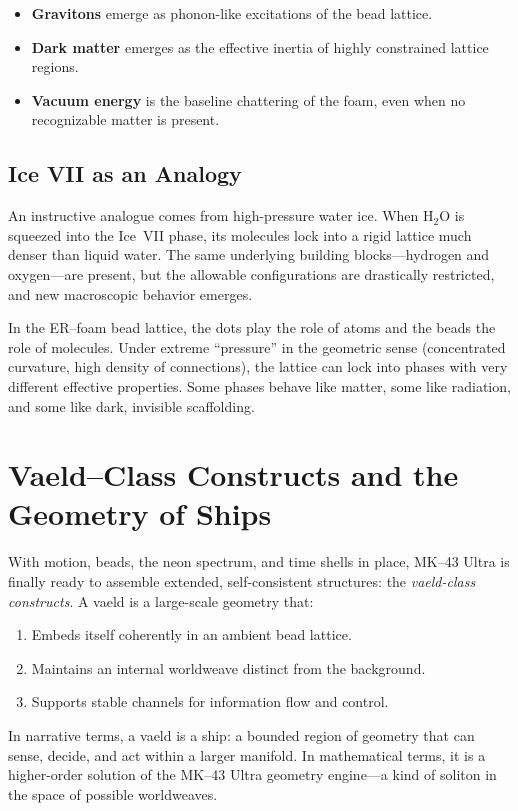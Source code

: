 \begin{itemize}
  \item \textbf{Gravitons} emerge as phonon-like excitations of the bead
  lattice.
  \item \textbf{Dark matter} emerges as the effective inertia of highly
  constrained lattice regions.
  \item \textbf{Vacuum energy} is the baseline chattering of the foam, even
  when no recognizable matter is present.
\end{itemize}

\section{Ice VII as an Analogy}
An instructive analogue comes from high-pressure water ice. When H$_2$O is
squeezed into the Ice~VII phase, its molecules lock into a rigid lattice much
denser than liquid water. The same underlying building blocks---hydrogen and
oxygen---are present, but the allowable configurations are drastically
restricted, and new macroscopic behavior emerges.

In the ER--foam bead lattice, the dots play the role of atoms and the beads
the role of molecules. Under extreme ``pressure'' in the geometric sense
(concentrated curvature, high density of connections), the lattice can lock
into phases with very different effective properties. Some phases behave like
matter, some like radiation, and some like dark, invisible scaffolding.

\chapter{Vaeld--Class Constructs and the Geometry of Ships}
With motion, beads, the neon spectrum, and time shells in place, MK--43 Ultra
is finally ready to assemble extended, self-consistent structures: the
\emph{vaeld-class constructs}. A vaeld is a large-scale geometry that:

\begin{enumerate}
  \item Embeds itself coherently in an ambient bead lattice.
  \item Maintains an internal worldweave distinct from the background.
  \item Supports stable channels for information flow and control.
\end{enumerate}

In narrative terms, a vaeld is a ship: a bounded region of geometry that can
sense, decide, and act within a larger manifold. In mathematical terms, it is
a higher-order solution of the MK--43 Ultra geometry engine---a kind of
soliton in the space of possible worldweaves.

